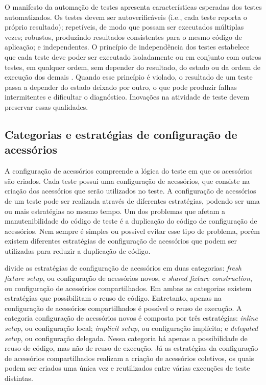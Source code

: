 O manifesto da automação de testes \cite{meszaros:etal:2003} apresenta características esperadas dos testes automatizados. Os testes devem ser autoverificáveis (i.e., cada teste reporta o próprio resultado); repetíveis, de modo que possam ser executados múltiplas vezes; robustos, produzindo resultados consistentes para o mesmo código de aplicação; e independentes. O princípio de independência dos testes estabelece que cada teste deve poder ser executado isoladamente ou em conjunto com outros testes, em qualquer ordem, sem depender do resultado, do estado ou da ordem de execução dos demais \cite{meszaros:etal:2003,meszaros:2007}. Quando esse princípio é violado, o resultado de um teste passa a depender do estado deixado por outro, o que pode produzir falhas intermitentes e dificultar o diagnóstico. Inovações na atividade de teste devem preservar essas qualidades.

\subsection{Categorias e estratégias de configuração de acessórios}

A configuração de acessórios compreende a lógica do teste em que os acessórios são criados. Cada teste possui uma configuração de acessórios, que consiste na criação dos acessórios que serão utilizados no teste. A configuração de acessórios de um teste pode ser realizada através de diferentes estratégias, podendo ser uma ou mais estratégias ao mesmo tempo. Um dos problemas que afetam a manutenibilidade do código de teste é a duplicação do código de configuração de acessórios. Nem sempre é simples ou possível evitar esse tipo de problema, porém existem diferentes estratégias de configuração de acessórios que podem ser utilizadas para reduzir a duplicação de código.

 divide as estratégias de configuração de acessórios em duas categorias: \textit{fresh fixture setup}, ou configuração de acessórios novos, e \textit{shared fixture construction}, ou configuração de acessórios compartilhados. Em ambas as categorias existem estratégias que possibilitam o reuso de código. Entretanto, apenas na configuração de acessórios compartilhados é possível o reuso de execução. A categoria configuração de acessórios novos é composta por três estratégias: \textit{inline setup}, ou configuração local; \textit{implicit setup}, ou configuração implícita; e \textit{delegated setup}, ou configuração delegada. Nessa categoria há apenas a possibilidade de reuso de código, mas não de reuso de execução. Já as estratégias da configuração de acessórios compartilhados realizam a criação de acessórios coletivos, os quais podem ser criados uma única vez e reutilizados entre várias execuções de teste distintas.

